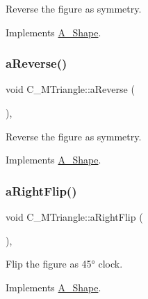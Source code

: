 Reverse the figure as symmetry. 



Implements \hyperlink{classA__Shape_afe2c7969d647f6358da13879a7534ecb}{A\+\_\+\+Shape}.

\mbox{\label{classC__MTriangle_a44614f4abb94f1a5f963cfb3e8fce7a5}} 
\subsubsection{\texorpdfstring{a\+Reverse()}{aReverse()}\hspace{0.1cm}{\footnotesize\ttfamily [2/2]}}
{\footnotesize\ttfamily void C\+\_\+\+M\+Triangle\+::a\+Reverse (\begin{DoxyParamCaption}{ }\end{DoxyParamCaption})\hspace{0.3cm}{\ttfamily [override]}, {\ttfamily [virtual]}}



Reverse the figure as symmetry. 



Implements \hyperlink{classA__Shape_afe2c7969d647f6358da13879a7534ecb}{A\+\_\+\+Shape}.

\mbox{\label{classC__MTriangle_aa3a1fc0604fa7e13b6c89d242357a163}} 
\subsubsection{\texorpdfstring{a\+Right\+Flip()}{aRightFlip()}\hspace{0.1cm}{\footnotesize\ttfamily [1/2]}}
{\footnotesize\ttfamily void C\+\_\+\+M\+Triangle\+::a\+Right\+Flip (\begin{DoxyParamCaption}{ }\end{DoxyParamCaption})\hspace{0.3cm}{\ttfamily [override]}, {\ttfamily [virtual]}}



Flip the figure as 45° clock. 



Implements \hyperlink{classA__Shape_a892688cbbad3297e00e87cce0dbfc76d}{A\+\_\+\+Shape}.

